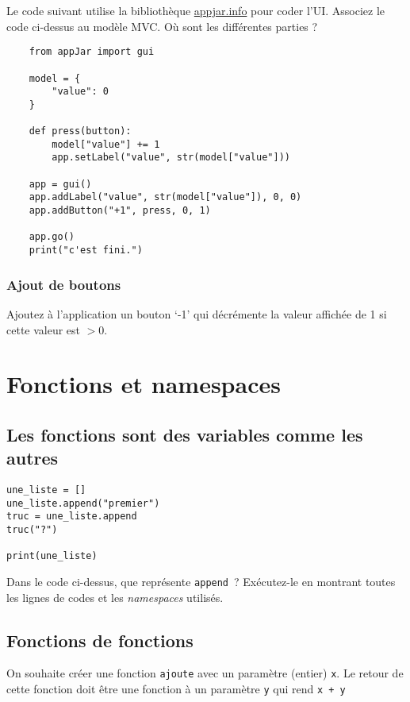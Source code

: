 \documentclass[12pt]{article}
\begin{document}
    Le code suivant utilise la bibliothèque \url{appjar.info} pour coder l'UI. Associez le code ci-dessus au modèle MVC. Où sont les différentes parties ? 
    
    \lstset{language=Python}
    \begin{lstlisting}
    from appJar import gui
    
    model = {
        "value": 0
    }
    
    def press(button):
        model["value"] += 1
        app.setLabel("value", str(model["value"]))
    
    app = gui()
    app.addLabel("value", str(model["value"]), 0, 0)
    app.addButton("+1", press, 0, 1)
    
    app.go()
    print("c'est fini.")
    \end{lstlisting}
    
    
    
    
    \subsubsection{Ajout de boutons}
    
    Ajoutez à  l'application un bouton `-1' qui décrémente la valeur affichée de 1 si cette valeur est $>0$.


\section{Fonctions et namespaces}

\subsection{Les fonctions sont des variables comme les autres}


\lstset{language=Python}
\begin{lstlisting}
une_liste = []
une_liste.append("premier")
truc = une_liste.append
truc("?")

print(une_liste)
\end{lstlisting}


Dans le code ci-dessus, que représente \verb|append|~? Exécutez-le en montrant toutes les lignes de codes et les {\em namespaces} utilisés.


\subsection{Fonctions de fonctions}

On souhaite créer une fonction \verb|ajoute| avec un paramètre (entier) \verb|x|. Le retour de cette fonction doit être une fonction à un paramètre \verb|y| qui rend \verb|x + y|
\end{document}
